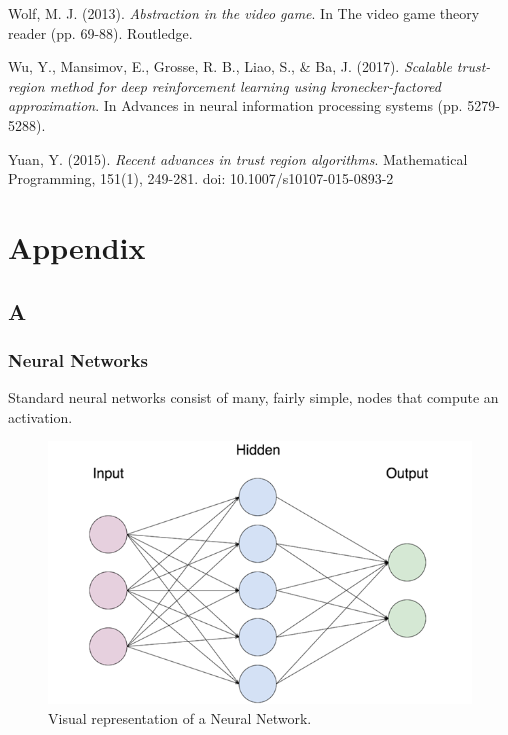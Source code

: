 \begin{thebibliography}{99}
\bibitem{} Wolf, M. J. (2013). \textit{Abstraction in the video game}. In The video game theory reader (pp. 69-88). Routledge.

\bibitem{} Wu, Y., Mansimov, E., Grosse, R. B., Liao, S., \& Ba, J. (2017).\textit{ Scalable trust-region method for deep reinforcement learning using kronecker-factored approximation}. In Advances in neural information processing systems (pp. 5279-5288).

\bibitem{} Yuan, Y. (2015). \textit{Recent advances in trust region algorithms}. Mathematical Programming, 151(1), 249-281. doi: 10.1007/s10107-015-0893-2

\end{thebibliography}

\section*{Appendix}
\subsection*{A}
\subsubsection*{Neural Networks}
Standard neural networks consist of many, fairly simple, nodes that compute an activation. 

\begin{figure}[h]
	\includegraphics[width=\columnwidth]{fig8.png} 
	\caption{Visual representation of a Neural Network.}
\end{figure}

